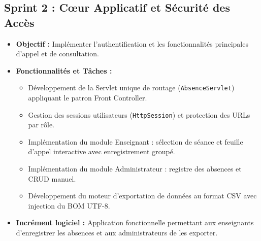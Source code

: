 \documentclass[12pt,a4paper]{article}
\begin{document}
\subsection{Sprint 2 : Cœur Applicatif et Sécurité des Accès}
\begin{itemize}
    \item \textbf{Objectif :} Implémenter l'authentification et les fonctionnalités principales d'appel et de consultation.
    \item \textbf{Fonctionnalités et Tâches :}
    \begin{itemize}
        \item Développement de la Servlet unique de routage (\texttt{AbsenceServlet}) appliquant le patron Front Controller.
        \item Gestion des sessions utilisateurs (\texttt{HttpSession}) et protection des URLs par rôle.
        \item Implémentation du module Enseignant : sélection de séance et feuille d'appel interactive avec enregistrement groupé.
        \item Implémentation du module Administrateur : registre des absences et CRUD manuel.
        \item Développement du moteur d'exportation de données au format CSV avec injection du BOM UTF-8.
    \end{itemize}
    \item \textbf{Incrément logiciel :} Application fonctionnelle permettant aux enseignants d'enregistrer les absences et aux administrateurs de les exporter.
\end{itemize}
\end{document}
